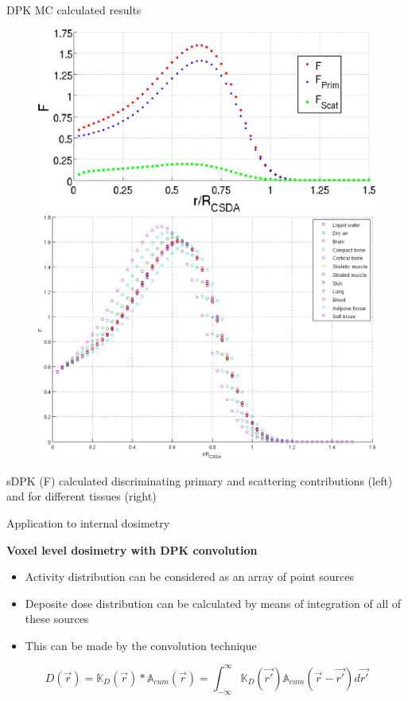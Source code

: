 \documentclass[ignorenonframetext,]{beamer}
\begin{document}
\begin{frame}{DPK MC calculated results}
\protect\hypertarget{dpk-mc-calculated-results-1}{}

\begin{figure}
\centering
\includegraphics[height=.3\textwidth]{imgs/dpk_discriminacion.png}
\includegraphics[height=.3\textwidth]{imgs/dpk_tissues.png}
\end{figure}

sDPK (F) calculated discriminating primary and scattering contributions
(left) and for different tissues (right)

\end{frame}

\begin{frame}{Application to internal dosimetry}
\protect\hypertarget{application-to-internal-dosimetry}{}

\textbf{Voxel level dosimetry with DPK convolution}

\begin{itemize}
\item
  Activity distribution can be considered as an array of point sources
\item
  Deposite dose distribution can be calculated by means of integration
  of all of these sources
\item
  This can be made by the convolution technique
\end{itemize}

\begin{equation}
D(\vec{r}) = \mathbb{K}_{D}(\vec{r}) \ast \mathbb{A}_{cum}(\vec{r}) = \int_{-\infty}^{\infty} \mathbb{K}_{D}(\vec{r'}) \mathbb{A}_{cum}(\vec{r} - \vec{r'}) d\vec{r'}
\end{equation}

\end{frame}
\end{document}
